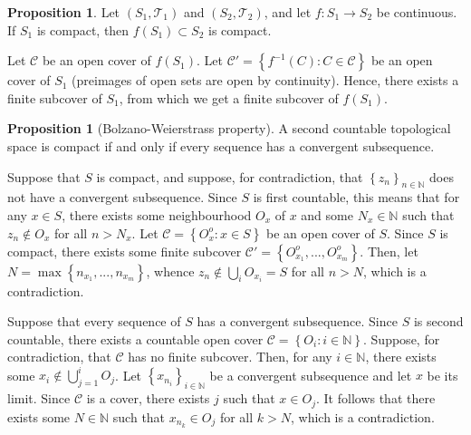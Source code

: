 \documentclass[11pt]{article}
\theoremstyle{definition}
\newtheorem{prop}[thm]{Proposition}
\newcommand{\set}[1]{\left\{ #1 \right\}}
\newcommand{\NN}{\mathbb{N}}
\newcommand{\m}[1]{\mathcal{#1}}
\begin{document}
\begin{prop}
Let $(S_1,\m{T}_1)$ and $(S_2,\m{T}_2)$, and let $f:S_1\to S_2$ be continuous. If $S_1$ is
compact, then $f(S_1)\subset S_2$ is compact.
\end{prop}
\proof
Let $\m{C}$ be an open cover of $f(S_1)$. Let $\m{C}'=\set{f^{-1}(C):C\in\m{C}}$ be an open
cover of $S_1$ (preimages of open sets are open by continuity). Hence, there exists a
finite subcover of $S_1$, from which we get a finite subcover of $f(S_1)$.
\qedhere

\begin{prop}[Bolzano-Weierstrass property]
A second countable topological space is compact if and only if every sequence has a
convergent subsequence.
\end{prop}
\proof
Suppose that $S$ is compact, and suppose, for contradiction, that $\set{z_n}_{n\in\NN}$
does not have a convergent subsequence. Since $S$ is first countable, this means that for
any $x\in S$, there exists some neighbourhood $O_x$ of $x$ and some $N_x\in\NN$ such that
$z_n\notin O_x$ for all $n>N_x$.  Let $\m{C}=\set{O_x^o:x\in S}$ be an open cover of $S$.
Since $S$ is compact, there exists some finite subcover
$\m{C}'=\set{O_{x_1}^o,...,O_{x_m}^o}$. Then, let $N=\max\set{n_{x_1},...,n_{x_m}}$, whence
$z_n\notin\bigcup_iO_{x_i}=S$ for all $n>N$, which is a contradiction.

Suppose that every sequence of $S$ has a convergent subsequence. Since $S$ is second
countable, there exists a countable open cover $\m{C}=\set{O_i:i\in\NN}$. Suppose, for
contradiction, that $\m{C}$ has no finite subcover. Then, for any $i\in\NN$, there exists
some $x_i\notin\bigcup_{j=1}^iO_j$. Let $\set{x_{n_i}}_{i\in\NN}$ be a convergent
subsequence and let $x$ be its limit. Since $\m{C}$ is a cover, there exists $j$ such that
$x\in O_j$. It follows that there exists some $N\in\NN$ such that $x_{n_k}\in O_j$ for all
$k>N$, which is a contradiction.
\qedhere







\end{document}
